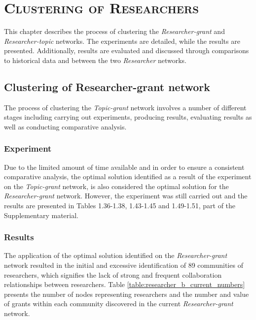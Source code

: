 \chapter{\textsc{Clustering of Researchers}}
\label{chapter:clustering_of_researchers}

This chapter describes the process of clustering the \textit{Researcher-grant} and \textit{Researcher-topic} networks. The experiments are detailed, while the results are presented. Additionally, results are evaluated and discussed through comparisons to historical data and between the two \textit{Researcher} networks.

\section{Clustering of Researcher-grant network}

The process of clustering the \textit{Topic-grant} network involves a number of different stages including carrying out experiments, producing results, evaluating results as well as conducting comparative analysis.

\subsection{Experiment}

Due to the limited amount of time available and in order to ensure a consistent comparative analysis, the optimal solution identified as a result of the experiment on the \textit{Topic-grant} network, is also considered the optimal solution for the \textit{Researcher-grant} network. However, the experiment was still carried out and the results are presented in Tables 1.36-1.38, 1.43-1.45 and 1.49-1.51, part of the Supplementary material.

\subsection{Results}

The application of the optimal solution identified on the \textit{Researcher-grant} network resulted in the initial and excessive identification of 89 communities of researchers, which signifies the lack of strong and frequent collaboration relationships between researchers. Table \ref{table:researcher_b_current_numbers} presents the number of nodes representing researchers and the number and value of grants within each community discovered in the current \textit{Researcher-grant} network.

